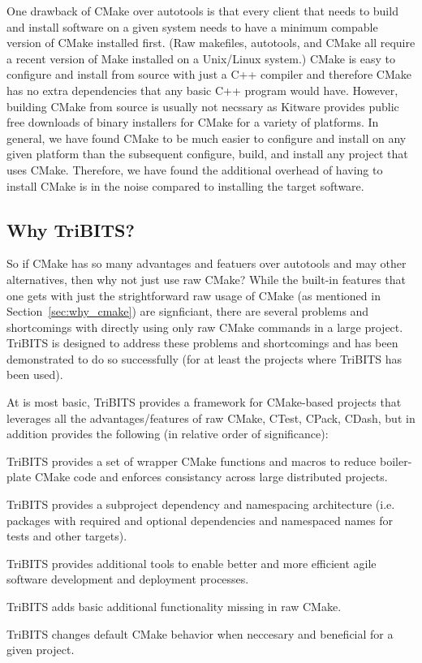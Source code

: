 \documentclass[note]{TechNote}
\begin{document}
One drawback of CMake over autotools is that every client that needs to build and install software on a given system needs to have a minimum compable version of CMake installed first.  (Raw makefiles, autotools, and CMake all require a recent version of Make installed on a Unix/Linux system.)  CMake is easy to configure and install from source with just a C++ compiler and therefore CMake has no extra dependencies that any basic C++ program would have.  However, building CMake from source is usually not necssary as Kitware provides public free downloads of binary installers for CMake for a variety of platforms.  In general, we have found CMake to be much easier to configure and install on any given platform than the subsequent configure, build, and install any project that uses CMake.  Therefore, we have found the additional overhead of having to install CMake is in the noise compared to installing the target software.

%
\subsection{Why TriBITS?}
\label{sec:why_tribits}
%

So if CMake has so many advantages and featuers over autotools and may other alternatives, then why not just use raw CMake?  While the built-in features that one gets with just the strightforward raw usage of CMake (as mentioned in Section~\ref{sec:why_cmake}) are signficiant, there are several problems and shortcomings with directly using only raw CMake commands in a large project.  TriBITS is designed to address these problems and shortcomings and has been demonstrated to do so successfully (for at least the projects where TriBITS has been used).

At is most basic, TriBITS provides a framework for CMake-based projects that leverages all the advantages/features of raw CMake, CTest, CPack, CDash, but in addition provides the following (in relative order of significance):

\begin{compactitem}
\item TriBITS provides a set of wrapper CMake functions and macros to reduce boiler-plate CMake code and enforces consistancy across large distributed projects.
\item TriBITS provides a subproject dependency and namespacing architecture (i.e. packages with required and optional dependencies and namespaced names for tests and other targets).
\item TriBITS provides additional tools to enable better and more efficient agile software development and deployment processes.
\item TriBITS adds basic additional functionality missing in raw CMake.
\item TriBITS changes default CMake behavior when neccesary and beneficial for a given project.
\end{compactitem}
\end{document}
